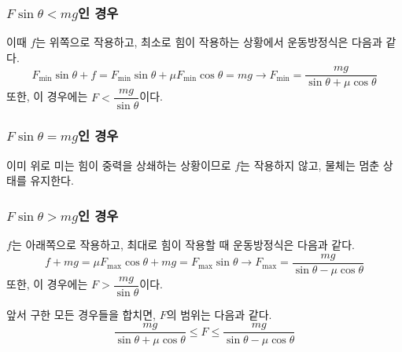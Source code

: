 \documentclass{scrartcl}
\begin{document}
\subsubsection{\(F\sin\theta<mg\)인 경우}
이때 \(f\)는 위쪽으로 작용하고, 최소로 힘이 작용하는 상황에서 운동방정식은 다음과 같다.
\[F_\text{min}\sin\theta+f=F_\text{min}\sin\theta+\mu F_\text{min}\cos\theta=mg\longrightarrow F_\text{min}=\frac{mg}{\sin\theta+\mu\cos\theta}\]
또한, 이 경우에는 \(F<\dfrac{mg}{\sin\theta}\)이다.

\subsubsection{\(F\sin\theta=mg\)인 경우}
이미 위로 미는 힘이 중력을 상쇄하는 상황이므로 \(f\)는 작용하지 않고, 물체는 멈춘 상태를 유지한다.

\subsubsection{\(F\sin\theta>mg\)인 경우}
\(f\)는 아래쪽으로 작용하고, 최대로 힘이 작용할 때 운동방정식은 다음과 같다.
\[f+mg=\mu F_\text{max}\cos\theta+mg=F_\text{max}\sin\theta\longrightarrow F_\text{max}=\frac{mg}{\sin\theta-\mu\cos\theta}\]
또한, 이 경우에는 \(F>\dfrac{mg}{\sin\theta}\)이다.

앞서 구한 모든 경우들을 합치면, \(F\)의 범위는 다음과 같다.
\[\frac{mg}{\sin\theta+\mu\cos\theta}\leq F\leq\frac{mg}{\sin\theta-\mu\cos\theta}\]
\end{document}
